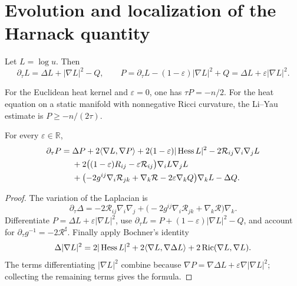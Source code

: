 \section{Evolution and localization of the Harnack quantity}

Let \(L=\log u\).  Then
\[
 \partial_\tau L=\Delta L+|\nabla L|^2-Q,
 \qquad P=\partial_\tau L-(1-\varepsilon)|\nabla L|^2+Q
 =\Delta L+\varepsilon|\nabla L|^2.
\]

\begin{remark}
\label{rem:chow-iii-model-harnack-quantity}
For the Euclidean heat kernel and \(\varepsilon=0\), one has
\(\tau P=-n/2\).  For the heat equation on a static manifold with
nonnegative Ricci curvature, the Li--Yau estimate is \(P\geq-n/(2\tau)\).
\end{remark}

\begin{lemma}
\label{lem:chow-iii-harnack-quantity-evolution}
For every \(\varepsilon\in\mathbb R\),
\[
\begin{aligned}
 \partial_\tau P={}&\Delta P+2\langle\nabla L,\nabla P\rangle
 +2(1-\varepsilon)|\Hess L|^2-2\mathcal R_{ij}\nabla_i\nabla_jL\\
 &+2\bigl((1-\varepsilon)R_{ij}-\varepsilon\mathcal R_{ij}\bigr)
   \nabla_iL\nabla_jL\\
 &+\bigl(-2g^{ij}\nabla_i\mathcal R_{jk}+\nabla_k\mathcal R
          -2\varepsilon\nabla_kQ\bigr)\nabla_kL-\Delta Q.
\end{aligned}
\]
\end{lemma}
\begin{proof}
The variation of the Laplacian is
\[
 \partial_\tau\Delta=-2\mathcal R_{ij}\nabla_i\nabla_j
 +\bigl(-2g^{ij}\nabla_i\mathcal R_{jk}+\nabla_k\mathcal R\bigr)\nabla_k.
\]
Differentiate \(P=\Delta L+\varepsilon|\nabla L|^2\), use
\(\partial_\tau L=P+(1-\varepsilon)|\nabla L|^2-Q\), and account for
\(\partial_\tau g^{-1}=-2\mathcal R^{\sharp}\).  Finally apply Bochner's
identity
\[
 \Delta|\nabla L|^2=2|\operatorname{Hess} L|^2
 +2\langle\nabla L,\nabla\Delta L\rangle
 +2\operatorname{Ric}(\nabla L,\nabla L).
\]
The terms differentiating \(|\nabla L|^2\) combine because
\(\nabla P=\nabla\Delta L+\varepsilon\nabla|\nabla L|^2\); collecting the
remaining terms gives the formula.
\end{proof}

